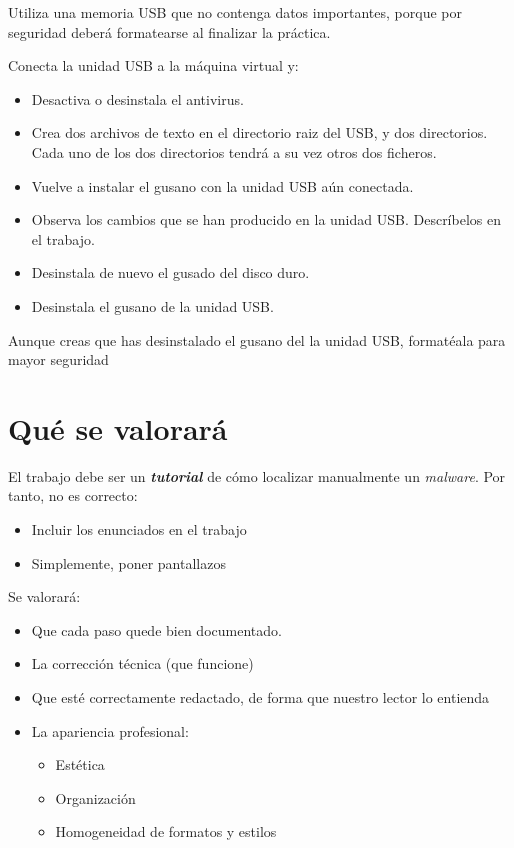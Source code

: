 \begin{homeworkProblem}
  \begin{Actividad}[Precaución]
    Utiliza una memoria USB que no contenga datos importantes, porque por seguridad deberá formatearse al finalizar la práctica.
  \end{Actividad}
  Conecta la unidad USB a la máquina virtual y:
  \begin{itemize}
  \item Desactiva o desinstala el antivirus.  
  \item Crea dos archivos de texto en el directorio raiz del USB, y dos directorios. Cada uno de los dos directorios tendrá a su vez otros dos ficheros.
  \item Vuelve a instalar el gusano con la unidad USB aún conectada.
  \item Observa los cambios que se han producido en la unidad USB. Descríbelos en el trabajo.
  \item Desinstala de nuevo el gusado del disco duro.
  \item Desinstala el gusano de la unidad USB.
  \end{itemize}

  \begin{Actividad}[Precaución]
    Aunque creas que has desinstalado el gusano del la unidad USB, formatéala para mayor seguridad
  \end{Actividad}
\end{homeworkProblem}

\section{Qué se valorará}
El trabajo debe ser un \textit{\textbf{tutorial}} de cómo localizar manualmente un \textit{malware}. Por tanto, no es correcto:
\begin{itemize}
\item Incluir los enunciados en el trabajo
\item Simplemente, poner pantallazos
\end{itemize}


Se valorará:
\begin{itemize}
\item Que cada paso quede bien documentado. 
\item La corrección técnica (que funcione)
\item Que esté correctamente redactado, de forma que nuestro lector lo entienda 
\item La apariencia profesional:
  \begin{itemize}
  \item Estética
  \item Organización
  \item Homogeneidad de formatos y estilos
  \end{itemize}
\end{itemize}

